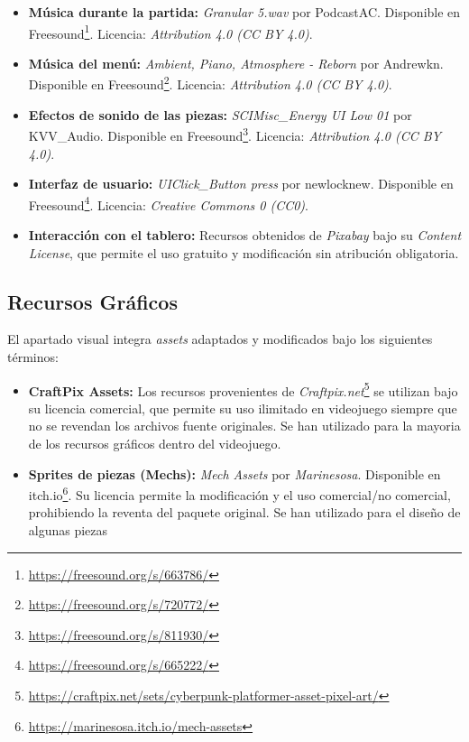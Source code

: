 \begin{itemize}
	\item \textbf{Música durante la partida:} \textit{Granular 5.wav} por PodcastAC. Disponible en Freesound\footnote{\url{https://freesound.org/s/663786/}}. Licencia: \textit{Attribution 4.0 (CC BY 4.0)}.
	\item \textbf{Música del menú:} \textit{Ambient, Piano, Atmosphere - Reborn} por Andrewkn. Disponible en Freesound\footnote{\url{https://freesound.org/s/720772/}}. Licencia: \textit{Attribution 4.0 (CC BY 4.0)}.
	\item \textbf{Efectos de sonido de las piezas:} \textit{SCIMisc\_Energy UI Low 01} por KVV\_Audio. Disponible en Freesound\footnote{\url{https://freesound.org/s/811930/}}. Licencia: \textit{Attribution 4.0 (CC BY 4.0)}.
	\item \textbf{Interfaz de usuario:} \textit{UIClick\_Button press} por newlocknew. Disponible en Freesound\footnote{\url{https://freesound.org/s/665222/}}. Licencia: \textit{Creative Commons 0 (CC0)}.
	\item \textbf{Interacción con el tablero:} Recursos obtenidos de \textit{Pixabay} bajo su \textit{Content License}, que permite el uso gratuito y modificación sin atribución obligatoria.
\end{itemize}

\subsection{Recursos Gráficos}

El apartado visual integra \textit{assets} adaptados y modificados bajo los siguientes términos:

\begin{itemize}
	\item \textbf{CraftPix Assets:} Los recursos provenientes de \textit{Craftpix.net}\footnote{\url{https://craftpix.net/sets/cyberpunk-platformer-asset-pixel-art/}} se utilizan bajo su licencia comercial, que permite su uso ilimitado en videojuego siempre que no se revendan los archivos fuente originales. Se han utilizado para la mayoria de los recursos gráficos dentro del videojuego.
	\item \textbf{Sprites de piezas (Mechs):} \textit{Mech Assets} por \textit{Marinesosa}. Disponible en itch.io\footnote{\url{https://marinesosa.itch.io/mech-assets}}. Su licencia permite la modificación y el uso comercial/no comercial, prohibiendo la reventa del paquete original. Se han utilizado para el diseño de algunas piezas
\end{itemize}

